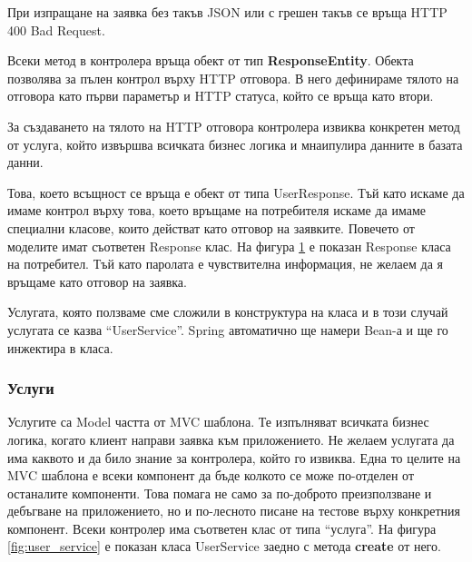         При изпращане на заявка без такъв JSON или с грешен такъв се връща HTTP 400 Bad Request.
        
        Всеки метод в контролера връща обект от тип \textbf{ResponseEntity}. Обекта позволява за пълен контрол върху HTTP отговора. В него дефинираме тялото на отговора като първи параметър и HTTP статуса, който се връща като втори.
        
        За създаването на тялото на HTTP отговора контролера извиква конкретен метод от услуга, който извършва всичката бизнес логика и мнаипулира данните в базата данни.
        
        Това, което всъщност се връща е обект от типа UserResponse. Тъй като искаме да имаме контрол върху това, което връщаме на потребителя искаме да имаме специални класове, които действат като отговор на заявките.
        Повечето от моделите имат съответен Response клас.
        На фигура \ref{fig:user_response} е показан Response класа на потребител.
        Тъй като паролата е чувствителна информация, не желаем да я връщаме като отговор на заявка.
        
        \begin{figure}[h]
            \centering
            \caption{}
            \label{fig:user_response}
        \end{figure}
        
        Услугата, която ползваме сме сложили в конструктура на класа и в този случай услугата се казва ``UserService''. Spring автоматично ще намери Bean-а и ще го инжектира в класа.
        
        \subsubsection{Услуги}
        Услугите са Model частта от MVC шаблона. Те изпълняват всичката бизнес логика, когато клиент направи заявка към приложението. Не желаем услугата да има каквото и да било знание за контролера, който го извиква. Една то целите на MVC шаблона е всеки компонент да бъде колкото се може по-отделен от останалите компоненти. Това помага не само за по-доброто преизползване и дебъгване на приложението, но и по-лесното писане на тестове върху конкретния компонент. Всеки контролер има съответен клас от типа ``услуга''.
        На фигура \ref{fig:user_service} е показан класа UserService заедно с метода \textbf{create} от него.
        
